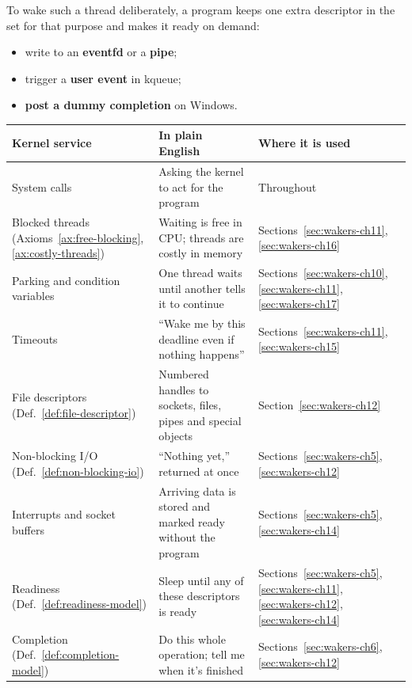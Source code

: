 To wake such a thread deliberately, a program keeps one extra descriptor in the set for that purpose and makes it ready on demand:

\begin{itemize}
    \item write to an \textbf{eventfd} or a \textbf{pipe};
    \item trigger a \textbf{user event} in kqueue;
    \item \textbf{post a dummy completion} on Windows.
\end{itemize}

\begin{table}[htbp]
    \centering\small
    \begin{tabularx}{\linewidth}{>{\raggedright\arraybackslash}p{4.4cm} Y >{\raggedright\arraybackslash}p{3.2cm}}
        \toprule
        \textbf{Kernel service} & \textbf{In plain English} & \textbf{Where it is used} \\
        \midrule
        System calls & Asking the kernel to act for the program & Throughout \\
        Blocked threads (Axioms~\ref{ax:free-blocking}, \ref{ax:costly-threads}) & Waiting is free in CPU; threads are costly in memory & Sections~\ref{sec:wakers-ch11}, \ref{sec:wakers-ch16} \\
        Parking and condition variables & One thread waits until another tells it to continue & Sections~\ref{sec:wakers-ch10}, \ref{sec:wakers-ch11}, \ref{sec:wakers-ch17} \\
        Timeouts & ``Wake me by this deadline even if nothing happens'' & Sections~\ref{sec:wakers-ch11}, \ref{sec:wakers-ch15} \\
        File descriptors (Def.~\ref{def:file-descriptor}) & Numbered handles to sockets, files, pipes and special objects & Section~\ref{sec:wakers-ch12} \\
        Non-blocking I/O (Def.~\ref{def:non-blocking-io}) & ``Nothing yet,'' returned at once & Sections~\ref{sec:wakers-ch5}, \ref{sec:wakers-ch12} \\
        Interrupts and socket buffers & Arriving data is stored and marked ready without the program & Sections~\ref{sec:wakers-ch5}, \ref{sec:wakers-ch14} \\
        Readiness (Def.~\ref{def:readiness-model}) & Sleep until any of these descriptors is ready & Sections~\ref{sec:wakers-ch5}, \ref{sec:wakers-ch11}, \ref{sec:wakers-ch12}, \ref{sec:wakers-ch14} \\
        Completion (Def.~\ref{def:completion-model}) & Do this whole operation; tell me when it's finished & Sections~\ref{sec:wakers-ch6}, \ref{sec:wakers-ch12} \\

\end{tabularx}
\end{table}
